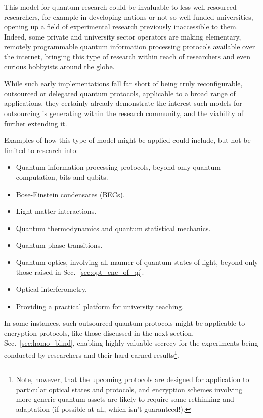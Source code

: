 This model for quantum research could be invaluable to less-well-resourced researchers, for example in developing nations or not-so-well-funded universities, opening up a field of experimental research previously inaccessible to them. Indeed, some private and university sector operators are making elementary, remotely programmable quantum information processing protocols available over the internet, bringing this type of research within reach of researchers and even curious hobbyists around the globe.

While such early implementations fall far short of being truly reconfigurable, outsourced or delegated quantum protocols, applicable to a broad range of applications, they certainly already demonstrate the interest such models for outsourcing is generating within the research community, and the viability of further extending it.

Examples of how this type of model might be applied could include, but not be limited to research into:
\begin{itemize}
	\item Quantum information processing protocols, beyond only quantum computation, bits and qubits.
	\item Bose-Einstein condensates (BECs).
	\item Light-matter interactions.
	\item Quantum thermodynamics and quantum statistical mechanics.
	\item Quantum phase-transitions.
	\item Quantum optics, involving all manner of quantum states of light, beyond only those raised in Sec.~\ref{sec:opt_enc_of_qi}.
	\item Optical interferometry.
	\item Providing a practical platform for university teaching.
\end{itemize}

In some instances, such outsourced quantum protocols might be applicable to encryption protocols, like those discussed in the next section, Sec.~\ref{sec:homo_blind}, enabling highly valuable secrecy for the experiments being conducted by researchers and their hard-earned results\footnote{Note, however, that the upcoming protocols are designed for application to particular optical states and protocols, and encryption schemes involving more generic quantum assets are likely to require some rethinking and adaptation (if possible at all, which isn't guaranteed!).}.

